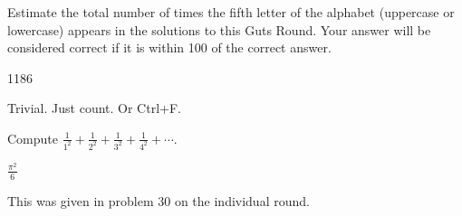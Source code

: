 \documentclass[11pt]{article}
\begin{document}
\begin{problem}
Estimate the total number of times the fifth letter of the alphabet (uppercase or lowercase) appears in the solutions to this Guts Round. Your answer will be considered correct if it is within 100 of the correct answer.
\end{problem}

\begin{answer}
1186
\end{answer}

\begin{solution}
Trivial. Just count. Or Ctrl+F.
\end{solution}

\begin{problem}
Compute $\frac{1}{1^2} + \frac{1}{2^2} + \frac{1}{3^2} + \frac{1}{4^2} + \cdots$.
\end{problem}

\begin{answer}
$\frac{\pi^2}{6}$
\end{answer}

\begin{solution}
This was given in problem 30 on the individual round.
\end{solution}
\end{document}
